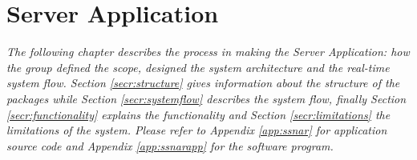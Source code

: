 \chapter{Server Application}
\textit{The following chapter describes the process in making the Server Application: how the group defined the scope, designed the system architecture and the real-time system flow. Section \ref{secr:structure} gives information about the structure of the packages while Section \ref{secr:systemflow} describes the system flow, finally Section \ref{secr:functionality} explains the functionality and Section \ref{secr:limitations} the limitations of the system. Please refer to Appendix \ref{app:ssnar} for application source code and Appendix \ref{app:ssnarapp} for the software program.}





